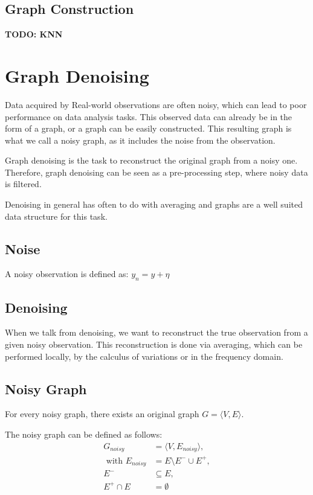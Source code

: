 \subsection{Graph Construction}
\textbf{TODO: KNN}

\section{Graph Denoising}
Data acquired by Real-world observations are often noisy, which can lead to poor 
performance on data analysis tasks. This observed data can already be in the form of a graph,
or a graph can be easily constructed. This resulting graph is what we call
a noisy graph, as it includes the noise from the observation.

Graph denoising is the task to reconstruct the original graph from a noisy one.
Therefore, graph denoising can be seen as a pre-processing step, where noisy data is filtered.

Denoising in general has often to do with averaging 
 and graphs are  a well suited data structure for this task\cite{noneLocalMean}.


\subsection{Noise}
A noisy observation is defined as:
$y_n = y + \eta$

\subsection{Denoising}
When we talk from denoising, we want to reconstruct the true observation 
from a given noisy observation. This reconstruction is done via averaging, which can be performed
locally, by the calculus of variations or in the frequency domain.

\subsection{Noisy Graph}
For every noisy graph, there exists an original graph $G = \langle V,E \rangle$.

The noisy graph can be defined as follows:
\begin{equation}
    \begin{aligned}
        G_{noisy} &= \langle V,E_{noisy} \rangle,  \\ 
        \text{ with }  E_{noisy} &= E \setminus  E^{-} \cup  E^{+}, \\ 
         E^{-} & \subseteq E, \\
         E^{+} \cap E &= \emptyset
    \end{aligned}
\end{equation}

